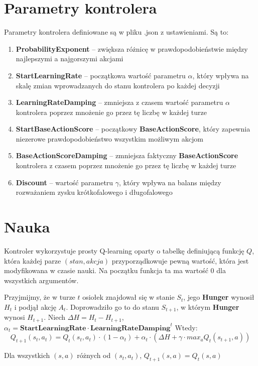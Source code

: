 \section{Parametry kontrolera}
Parametry kontrolera definiowane są w pliku .json z ustawieniami. Są to:
\begin{enumerate}
    \item\textbf{ProbabilityExponent} -- zwiększa różnicę w prawdopodobieństwie między najlepszymi a najgorszymi akcjami
    \item\textbf{StartLearningRate} -- początkowa wartość parametru $\alpha$, który wpływa na skalę zmian wprowadzanych do stanu kontrolera po każdej decyzji
    \item\textbf{LearningRateDamping} -- zmniejsza z czasem wartość parametru $\alpha$ kontrolera poprzez mnożenie go przez tę liczbę w każdej turze
    \item\textbf{StartBaseActionScore} -- początkowy \textbf{BaseActionScore}, który zapewnia niezerowe prawdopodobieństwo wszystkim możliwym akcjom
    \item\textbf{BaseActionScoreDamping} -- zmniejsza faktyczny \textbf{BaseActionScore} kontrolera z czasem poprzez mnożenie go przez tę liczbę w każdej turze
    \item\textbf{Discount} -- wartość parametru $\gamma$, który wpływa na balans między rozważaniem zysku krótkofalowego i długofalowego
\end{enumerate}

\section{Nauka}
Kontroler wykorzystuje prosty Q-learning oparty o tabelkę definiującą funkcję $Q$, która każdej parze $(stan,akcja)$ przyporządkowuje pewną wartość, która jest modyfikowana w czasie nauki. Na początku funkcja ta ma wartość 0 dla wszystkich argumentów.

Przyjmijmy, że w turze $t$ osiołek znajdował się w stanie $S_{t}$, jego \textbf{Hunger} wynosił $H_{t}$ i podjął akcję $A_{t}$. Doprowadziło go to do stanu $S_{t+1}$, w którym \textbf{Hunger} wynosi $H_{t+1}$. Niech $\Delta H = H_{t} - H_{t+1}$, $\alpha_{t} = \textbf{StartLearningRate} \cdot \textbf{LearningRateDamping}^{t}$ Wtedy:
\[Q_{t+1}(s_{t},a_{t})= Q_{t}(s_{t},a_{t}) \cdot (1-\alpha_{t}) + \alpha_{t} \cdot (\Delta H + \gamma \cdot max_{a}Q_{t}(s_{t+1},a))
\]

Dla wszystkich $(s,a)$ różnych od $(s_{t},a_{t})$, $Q_{t+1}(s,a) = Q_{t}(s,a)$

